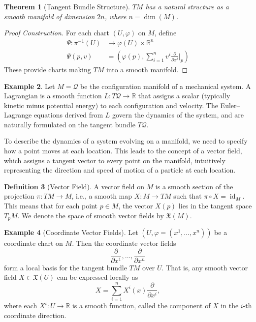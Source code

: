 \documentclass{article}
\theoremstyle{plain}
\newtheorem{theorem}{Theorem}[section]
\theoremstyle{definition}
\newtheorem{definition}[theorem]{Definition}
\newtheorem{example}[theorem]{Example}
\theoremstyle{remark}
\DeclareMathOperator{\id}{id}
\newcommand{\R}{\mathbb{R}}
\begin{document}
\begin{theorem}[Tangent Bundle Structure]
$TM$ has a natural structure as a smooth manifold of dimension $2n$, where $n = \dim(M)$.
\end{theorem}

\begin{proof}[Proof Construction]
For each chart $(U, \varphi)$ on $M$, define
\begin{align}
\Psi: \pi^{-1}(U) &\to \varphi(U) \times \R^n\\
\Psi(p, v) &= \left(\varphi(p), \sum_{i=1}^n v^i \frac{\partial}{\partial x^i}\bigg|_p\right)
\end{align}
These provide charts making $TM$ into a smooth manifold.
\end{proof}

\begin{example}
Let $M = \mathcal{Q}$ be the configuration manifold of a mechanical system. A Lagrangian is a smooth function $L: T\mathcal{Q} \to \mathbb{R}$ that assigns a scalar (typically kinetic minus potential energy) to each configuration and velocity. The Euler–Lagrange equations derived from $L$ govern the dynamics of the system, and are naturally formulated on the tangent bundle $T\mathcal{Q}$.
\end{example}

To describe the dynamics of a system evolving on a manifold, we need to specify how a point moves at each location. This leads to the concept of a vector field, which assigns a tangent vector to every point on the manifold, intuitively representing the direction and speed of motion of a particle at each location.

\begin{definition}[Vector Field]
A vector field on $M$ is a smooth section of the projection $\pi: TM \to M$, i.e., a smooth map $X: M \to TM$ such that $\pi \circ X = \id_M$. This means that for each point $p \in M$, the vector $X(p)$ lies in the tangent space $T_p M$.
We denote the space of smooth vector fields by $\mathfrak{X}(M)$.

\end{definition}



\begin{example}[Coordinate Vector Fields]
Let $(U, \varphi = (x^1, \dots, x^n))$ be a coordinate chart on $M$. Then the coordinate vector fields
\begin{equation*}
    \frac{\partial}{\partial x^1}, \dots, \frac{\partial}{\partial x^n}
\end{equation*}
form a local basis for the tangent bundle $TM$ over $U$. That is, any smooth vector field $X \in \mathfrak{X}(U)$ can be expressed locally as
\begin{equation*}
X = \sum_{i=1}^n X^i(x) \frac{\partial}{\partial x^i},
\end{equation*}
where each $X^i: U \to \mathbb{R}$ is a smooth function, called the component of $X$ in the $i$-th coordinate direction.
\end{example}
\end{document}
